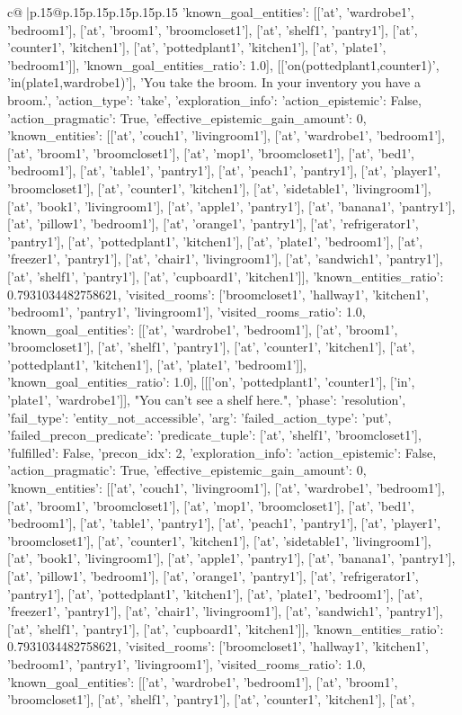 \documentclass{article}
\begin{document}
{\begin{supertabular}{c@{$\;$}|p{.15\linewidth}@{}p{.15\linewidth}p{.15\linewidth}p{.15\linewidth}p{.15\linewidth}p{.15\linewidth}}
{{{'known_goal_entities': [['at', 'wardrobe1', 'bedroom1'], ['at', 'broom1', 'broomcloset1'], ['at', 'shelf1', 'pantry1'], ['at', 'counter1', 'kitchen1'], ['at', 'pottedplant1', 'kitchen1'], ['at', 'plate1', 'bedroom1']], 'known_goal_entities_ratio': 1.0}}], [['on(pottedplant1,counter1)', 'in(plate1,wardrobe1)'], 'You take the broom. In your inventory you have a broom.', {'action_type': 'take', 'exploration_info': {'action_epistemic': False, 'action_pragmatic': True, 'effective_epistemic_gain_amount': 0, 'known_entities': [['at', 'couch1', 'livingroom1'], ['at', 'wardrobe1', 'bedroom1'], ['at', 'broom1', 'broomcloset1'], ['at', 'mop1', 'broomcloset1'], ['at', 'bed1', 'bedroom1'], ['at', 'table1', 'pantry1'], ['at', 'peach1', 'pantry1'], ['at', 'player1', 'broomcloset1'], ['at', 'counter1', 'kitchen1'], ['at', 'sidetable1', 'livingroom1'], ['at', 'book1', 'livingroom1'], ['at', 'apple1', 'pantry1'], ['at', 'banana1', 'pantry1'], ['at', 'pillow1', 'bedroom1'], ['at', 'orange1', 'pantry1'], ['at', 'refrigerator1', 'pantry1'], ['at', 'pottedplant1', 'kitchen1'], ['at', 'plate1', 'bedroom1'], ['at', 'freezer1', 'pantry1'], ['at', 'chair1', 'livingroom1'], ['at', 'sandwich1', 'pantry1'], ['at', 'shelf1', 'pantry1'], ['at', 'cupboard1', 'kitchen1']], 'known_entities_ratio': 0.7931034482758621, 'visited_rooms': ['broomcloset1', 'hallway1', 'kitchen1', 'bedroom1', 'pantry1', 'livingroom1'], 'visited_rooms_ratio': 1.0, 'known_goal_entities': [['at', 'wardrobe1', 'bedroom1'], ['at', 'broom1', 'broomcloset1'], ['at', 'shelf1', 'pantry1'], ['at', 'counter1', 'kitchen1'], ['at', 'pottedplant1', 'kitchen1'], ['at', 'plate1', 'bedroom1']], 'known_goal_entities_ratio': 1.0}}], [[['on', 'pottedplant1', 'counter1'], ['in', 'plate1', 'wardrobe1']], "You can't see a shelf here.", {'phase': 'resolution', 'fail_type': 'entity_not_accessible', 'arg': {'failed_action_type': 'put', 'failed_precon_predicate': {'predicate_tuple': ['at', 'shelf1', 'broomcloset1'], 'fulfilled': False, 'precon_idx': 2}}, 'exploration_info': {'action_epistemic': False, 'action_pragmatic': True, 'effective_epistemic_gain_amount': 0, 'known_entities': [['at', 'couch1', 'livingroom1'], ['at', 'wardrobe1', 'bedroom1'], ['at', 'broom1', 'broomcloset1'], ['at', 'mop1', 'broomcloset1'], ['at', 'bed1', 'bedroom1'], ['at', 'table1', 'pantry1'], ['at', 'peach1', 'pantry1'], ['at', 'player1', 'broomcloset1'], ['at', 'counter1', 'kitchen1'], ['at', 'sidetable1', 'livingroom1'], ['at', 'book1', 'livingroom1'], ['at', 'apple1', 'pantry1'], ['at', 'banana1', 'pantry1'], ['at', 'pillow1', 'bedroom1'], ['at', 'orange1', 'pantry1'], ['at', 'refrigerator1', 'pantry1'], ['at', 'pottedplant1', 'kitchen1'], ['at', 'plate1', 'bedroom1'], ['at', 'freezer1', 'pantry1'], ['at', 'chair1', 'livingroom1'], ['at', 'sandwich1', 'pantry1'], ['at', 'shelf1', 'pantry1'], ['at', 'cupboard1', 'kitchen1']], 'known_entities_ratio': 0.7931034482758621, 'visited_rooms': ['broomcloset1', 'hallway1', 'kitchen1', 'bedroom1', 'pantry1', 'livingroom1'], 'visited_rooms_ratio': 1.0, 'known_goal_entities': [['at', 'wardrobe1', 'bedroom1'], ['at', 'broom1', 'broomcloset1'], ['at', 'shelf1', 'pantry1'], ['at', 'counter1', 'kitchen1'], ['at', }}}
\end{supertabular}}
\end{document}
